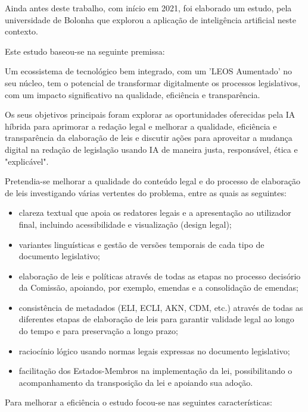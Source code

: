 Ainda antes deste trabalho, com início em 2021, foi elaborado um estudo, 
pela universidade de Bolonha que explorou a aplicação de inteligência artificial neste contexto.

Este estudo baseou-se na seguinte premissa:

\begin{quoting}
    Um ecossistema de tecnológico bem integrado, com um 'LEOS Aumentado' no seu núcleo, 
    tem o potencial de transformar digitalmente os processos legislativos, com um impacto 
    significativo na qualidade, eficiência e transparência.
\end{quoting}

Os seus objetivos principais foram explorar as oportunidades oferecidas pela IA híbrida para aprimorar 
a redação legal e melhorar a qualidade, eficiência e transparência da elaboração de leis e discutir 
ações para aproveitar a mudança digital na redação de legislação usando IA de maneira justa, 
responsável, ética e "explicável". 

Pretendia-se melhorar a qualidade do conteúdo legal e do processo de elaboração de leis 
investigando várias vertentes do problema, entre as quais as seguintes:

\begin{itemize}

\item clareza textual que apoia os redatores legais e a apresentação ao utilizador final, 
incluindo acessibilidade e visualização (design legal);
\item variantes linguísticas e gestão de versões temporais de cada tipo de documento legislativo;
\item elaboração de leis e políticas através de todas as etapas no processo decisório da Comissão, 
apoiando, por exemplo, emendas e a consolidação de emendas;
\item consistência de metadados (ELI, ECLI, AKN, CDM, etc.) através de todas as diferentes etapas 
de elaboração de leis para garantir validade legal ao longo do tempo e para preservação a longo prazo;
\item raciocínio lógico usando normas legais expressas no documento legislativo; 
\item facilitação dos Estados-Membros na implementação da lei, possibilitando o acompanhamento da 
transposição da lei e apoiando sua adoção.

\end{itemize}

Para melhorar a eficiência o estudo focou-se nas seguintes características:

